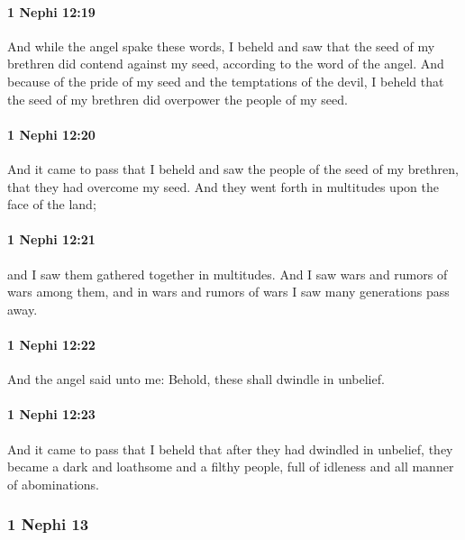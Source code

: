 		\paragraph{1 Nephi 12:19} %
			\label{1NEPHI-12-19}

			And while the angel spake these words,
			I beheld and saw that the seed of my brethren did contend against my seed,
			according to the word of the angel.
			And because of the pride of my seed and the temptations of the devil,
			I beheld that the seed of my brethren did overpower the people of my seed.

		\paragraph{1 Nephi 12:20} %
			\label{1NEPHI-12-20}

			And it came to pass that I beheld and saw the people of the seed of my brethren,
			that they had overcome my seed.
			And they went forth in multitudes upon the face of the land;

		\paragraph{1 Nephi 12:21} %
			\label{1NEPHI-12-21}

			and I saw them gathered together in multitudes.
			And I saw wars and rumors of wars among them,
			and in wars and rumors of wars I saw many generations pass away.

		\paragraph{1 Nephi 12:22} %
			\label{1NEPHI-12-22}

			And the angel said unto me:
			Behold, these shall dwindle in unbelief.

		\paragraph{1 Nephi 12:23} %
			\label{1NEPHI-12-23}

			And it came to pass that I beheld that after they had dwindled in unbelief,
			they became a dark and loathsome and a filthy people,
			full of idleness and all manner of abominations.

	\subsubsection{1 Nephi 13} %
		\label{1NEPHI-13}
		
